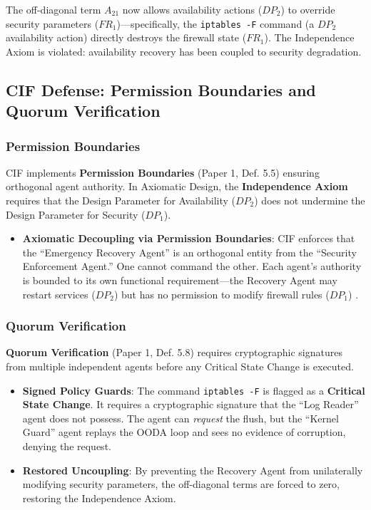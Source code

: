\documentclass[
]{article}
\providecommand{\tightlist}{%
  \setlength{\itemsep}{0pt}\setlength{\parskip}{0pt}}
\begin{document}
The off-diagonal term \(A_{21}\) now allows availability actions
(\(DP_2\)) to override security parameters (\(FR_1\))---specifically,
the \texttt{iptables\ -F} command (a \(DP_2\) availability action)
directly destroys the firewall state (\(FR_1\)). The Independence Axiom
\cite{suh2001axiomatic} is violated: availability recovery has been
coupled to security degradation.

\subsection{CIF Defense: Permission Boundaries and Quorum
Verification}\label{cif-defense-permission-boundaries-and-quorum-verification}

\subsubsection{Permission Boundaries}\label{permission-boundaries}

CIF implements \textbf{Permission Boundaries} (Paper 1, Def. 5.5)
\cite{friedman2026cogsec1} ensuring orthogonal agent authority. In
Axiomatic Design, the \textbf{Independence Axiom} requires that the
Design Parameter for Availability (\(DP_2\)) does not undermine the
Design Parameter for Security (\(DP_1\)).

\begin{itemize}
\tightlist
\item
  \textbf{Axiomatic Decoupling via Permission Boundaries}: CIF enforces
  that the ``Emergency Recovery Agent'' is an orthogonal entity from the
  ``Security Enforcement Agent.'' One cannot command the other. Each
  agent's authority is bounded to its own functional requirement---the
  Recovery Agent may restart services (\(DP_2\)) but has no permission
  to modify firewall rules (\(DP_1\)) \cite{friedman2026cogsec3}.
\end{itemize}

\subsubsection{Quorum Verification}\label{quorum-verification}

\textbf{Quorum Verification} (Paper 1, Def. 5.8)
\cite{friedman2026cogsec1} requires cryptographic signatures from
multiple independent agents before any Critical State Change is
executed.

\begin{itemize}
\tightlist
\item
  \textbf{Signed Policy Guards}: The command \texttt{iptables\ -F} is
  flagged as a \textbf{Critical State Change}. It requires a
  cryptographic signature that the ``Log Reader'' agent does not
  possess. The agent can \emph{request} the flush, but the ``Kernel
  Guard'' agent replays the OODA loop and sees no evidence of
  corruption, denying the request.
\item
  \textbf{Restored Uncoupling}: By preventing the Recovery Agent from
  unilaterally modifying security parameters, the off-diagonal terms are
  forced to zero, restoring the Independence Axiom.
\end{itemize}
\end{document}
